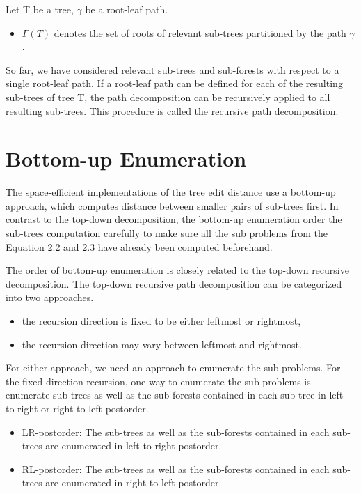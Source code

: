 \begin{notation}
Let T be a tree, $\gamma$ be a root-leaf path.
\begin{itemize}
\item $\Gamma(T)$ denotes the set of roots of relevant sub-trees partitioned by the path $\gamma$.
\end{itemize}

\end{notation}

So far, we have considered relevant sub-trees and sub-forests with respect to a single root-leaf path. If a root-leaf path can be defined for each of the resulting sub-trees of tree T,  the path decomposition can be recursively applied to all resulting sub-trees. This procedure is called the recursive path decomposition.
\section{Bottom-up Enumeration}
The space-efficient implementations of the tree edit distance use a bottom-up approach, which computes distance between smaller pairs of sub-trees first. In contrast to the top-down decomposition, the bottom-up enumeration order the sub-trees computation carefully to make sure all the sub problems from the Equation 2.2 and 2.3 have already been computed beforehand. 

The order of bottom-up enumeration is closely related to the top-down recursive decomposition. The top-down recursive path decomposition can be categorized into two approaches.

\begin{itemize}
\item the recursion direction is fixed to be either leftmost or rightmost,
\item the recursion direction may vary between leftmost and rightmost.
\end{itemize}

For either approach, we need an approach to enumerate the sub-problems. For the fixed direction recursion, one way to enumerate the sub problems is enumerate sub-trees as well as the sub-forests contained in each sub-tree in left-to-right or right-to-left postorder. 

\begin{itemize}
\item LR-postorder: The sub-trees as well as the sub-forests contained in each sub-trees are enumerated in left-to-right postorder.
\item RL-postorder: The sub-trees as well as the sub-forests contained in each sub-trees are enumerated in right-to-left postorder.
\end{itemize}

